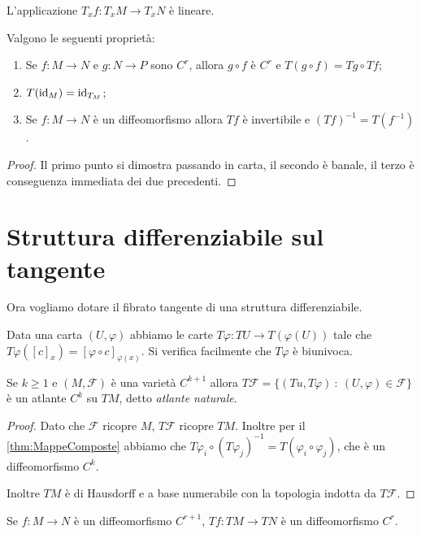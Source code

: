 \begin{remark}
	L'applicazione $T_xf:T_xM\to T_xN$ è lineare.
\end{remark}
 
\begin{theorem} \label{thm:MappeComposte} 
	Valgono le seguenti proprietà:
	\begin{enumerate}
	\item Se $f:M\to N$ e $g:N\to P$ sono $C^r$, allora $g\circ f$ è $C^r$ e $T(g\circ f)=Tg\circ Tf$;
	\item $T(\mathrm{id}_M)=\mathrm{id}_{T_M}$;
	\item Se $f:M\to N$ è un diffeomorfismo allora $Tf$ è invertibile e $(Tf)^{-1}=T(f^{-1})$.
	\end{enumerate}
\end{theorem}

\begin{proof}
	Il primo punto si dimostra passando in carta, il secondo è banale, il terzo è conseguenza immediata dei due precedenti.
\end{proof}

\section{Struttura differenziabile sul tangente}
Ora vogliamo dotare il fibrato tangente di una struttura differenziabile.
 
Data una carta $(U,\varphi)$ abbiamo le carte $T\varphi:TU\to T(\varphi(U))$ tale che $T\varphi([c]_x)=[\varphi\circ c]_{\varphi(x)}$. Si verifica facilmente che $T\varphi$ è biunivoca.
 
\begin{proposition} 
	Se $k\ge 1$ e $(M,\mathcal F)$ è una varietà $C^{k+1}$ allora $T\mathcal F=\{(Tu,T\varphi)\ :\ (U,\varphi)\in\mathcal F\}$ è un atlante $C^k$ su $TM$, detto \emph{atlante naturale}.
\end{proposition}

\begin{proof}
	Dato che $\mathcal F$ ricopre $M$, $T\mathcal F$ ricopre $TM$. Inoltre per il \cref{thm:MappeComposte} abbiamo che  $T\varphi_i\circ(T\varphi_j)^{-1}=T(\varphi_i\circ\varphi_j)$, che è un diffeomorfismo $C^k$.
	
	Inoltre $TM$ è di Hausdorff e a base numerabile con la topologia indotta da $T\mathcal F$.
\end{proof}

\begin{proposition}
	Se $f:M\to N$ è un diffeomorfismo $C^{r+1}$, $Tf:TM\to TN$ è un diffeomorfismo $C^r$.
\end{proposition}

